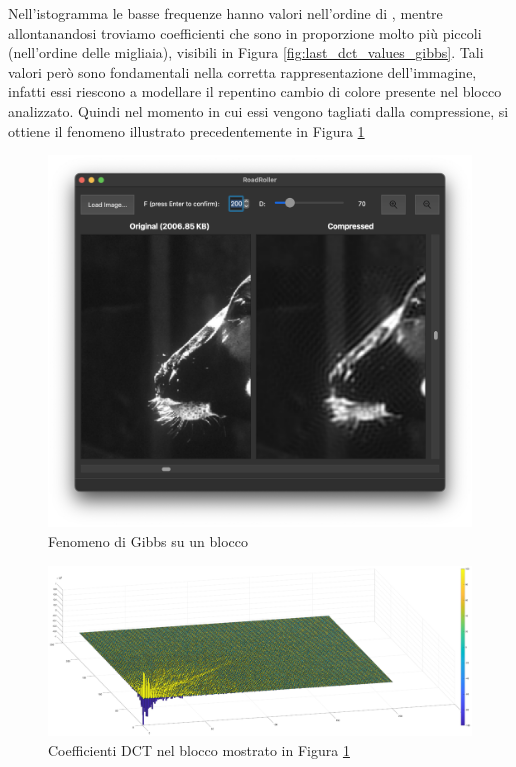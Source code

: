 Nell'istogramma le basse frequenze hanno valori nell'ordine di , mentre allontanandosi troviamo coefficienti che sono in proporzione molto più piccoli (nell'ordine delle migliaia), visibili in Figura \ref{fig:last_dct_values_gibbs}. Tali valori però sono fondamentali nella corretta rappresentazione dell'immagine, infatti essi riescono a modellare il repentino cambio di colore presente nel blocco analizzato. Quindi nel momento in cui essi vengono tagliati dalla compressione, si ottiene il fenomeno illustrato precedentemente in Figura \ref{fig:gibbs}

\begin{figure}[h]
	\centering
	\includegraphics[width=1\linewidth]{figures/gibbs_phenomenon}
	\caption{Fenomeno di Gibbs su un blocco}
	\label{fig:gibbs}
\end{figure}


\begin{figure}
	\centering
	\includegraphics[width=1\linewidth]{figures/dct_values_3d.eps}
	\caption{Coefficienti DCT nel blocco mostrato in Figura \ref{fig:gibbs}}
	\label{fig:dct_values_on_gibbs}
\end{figure}

